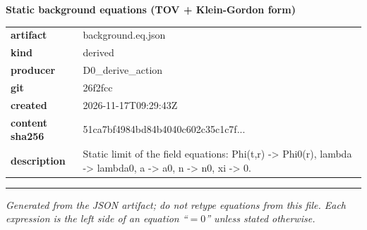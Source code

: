 \documentclass[10pt,a4paper]{article}
\begin{document}
{\Large\bfseries Static background equations (TOV + Klein-Gordon form)}\par
\smallskip
\begin{tabular}{@{}lp{}@{}}\textbf{artifact} & background.eq.json\\\textbf{kind} & derived\\\textbf{producer} & D0\_derive\_action\\\textbf{git} & 26f2fcc\\\textbf{created} & 2026-11-17T09:29:43Z\\\textbf{content sha256} & 51ca7bf4984bd84b4040c602c35c1c7f...\\\textbf{description} & Static limit of the field equations: Phi(t,r) -> Phi0(r), lambda -> lambda0, a -> a0, n -> n0, xi -> 0.\\\end{tabular}
\par\medskip\hrule\medskip

\textit{Generated from the JSON artifact; do not retype equations from this file. Each expression is the left side of an equation ``$= 0$'' unless stated otherwise.}\par
\end{document}
